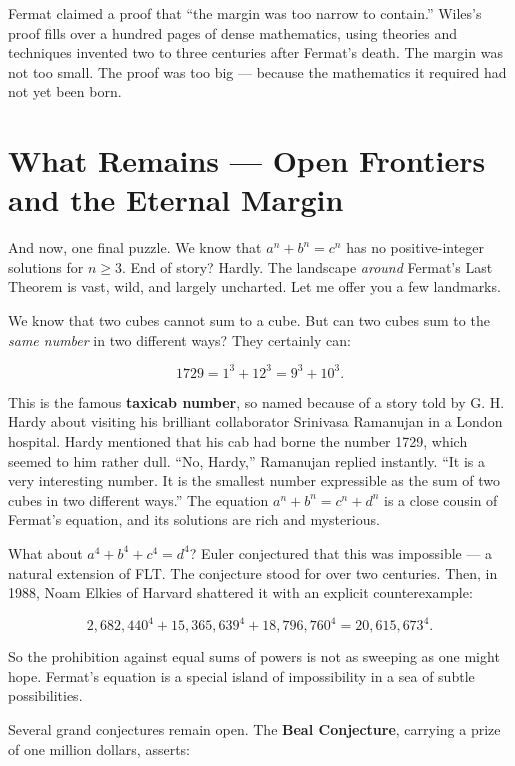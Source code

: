 Fermat claimed a proof that ``the margin was too narrow to contain.'' Wiles's proof fills over a hundred pages of dense mathematics, using theories and techniques invented two to three centuries after Fermat's death. The margin was not too small. The proof was too big --- because the mathematics it required had not yet been born.



\section{What Remains --- Open Frontiers and the Eternal Margin}\label{ch10-what-remains-open-frontiers-and-the-eternal-margin}

And now, one final puzzle. We know that \(a^n + b^n = c^n\) has no positive-integer solutions for \(n \ge 3\). End of story? Hardly. The landscape \emph{around} Fermat's Last Theorem is vast, wild, and largely uncharted. Let me offer you a few landmarks.

We know that two cubes cannot sum to a cube. But can two cubes sum to the \emph{same number} in two different ways? They certainly can:

\[1729 = 1^3 + 12^3 = 9^3 + 10^3.\]

This is the famous \textbf{taxicab number}, so named because of a story told by G. H. Hardy about visiting his brilliant collaborator Srinivasa Ramanujan in a London hospital. Hardy mentioned that his cab had borne the number 1729, which seemed to him rather dull. ``No, Hardy,'' Ramanujan replied instantly. ``It is a very interesting number. It is the smallest number expressible as the sum of two cubes in two different ways.'' The equation \(a^n + b^n = c^n + d^n\) is a close cousin of Fermat's equation, and its solutions are rich and mysterious.

What about \(a^4 + b^4 + c^4 = d^4\)? Euler conjectured that this was impossible --- a natural extension of FLT. The conjecture stood for over two centuries. Then, in 1988, Noam Elkies of Harvard shattered it with an explicit counterexample:

\[2{,}682{,}440^4 + 15{,}365{,}639^4 + 18{,}796{,}760^4 = 20{,}615{,}673^4.\]

So the prohibition against equal sums of powers is not as sweeping as one might hope. Fermat's equation is a special island of impossibility in a sea of subtle possibilities.

Several grand conjectures remain open. The \textbf{Beal Conjecture}, carrying a prize of one million dollars, asserts:

